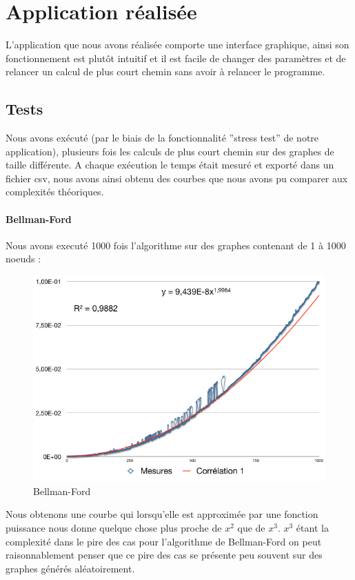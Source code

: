 \documentclass[a4paper,12pt,final] {article}
\begin{document}
\newpage
\section{Application réalisée}
L'application que nous avons réalisée comporte une interface graphique, ainsi son fonctionnement est plutôt intuitif et il est facile de changer des paramètres et de relancer un calcul de plus court chemin sans avoir à relancer le programme.
\subsection{Tests}

Nous avons exécuté (par le biais de la fonctionnalité ''stress test'' de notre application), plusieurs fois les calculs de plus court chemin sur des graphes de taille différente. A chaque exécution le temps était mesuré et exporté dans un fichier csv, nous avons ainsi obtenu des courbes que nous avons pu comparer aux complexités théoriques.
\paragraph{Bellman-Ford}
Nous avons executé 1000 fois l'algorithme sur des graphes contenant de 1 à 1000 noeuds :

\begin{figure}[H]
\begin{center}
\includegraphics[scale=0.4]{bellman}
\end{center}
\caption{Bellman-Ford}
\end{figure}

Nous obtenons une courbe qui lorsqu'elle est approximée par une fonction puissance nous donne quelque chose plus proche de $x^{2}$ que de $x^{3}$. $x^{3}$ étant la complexité dans le pire des cas pour l'algorithme de Bellman-Ford on peut raisonnablement penser que ce pire des cas se présente peu souvent sur des graphes générés aléatoirement.
\end{document}
